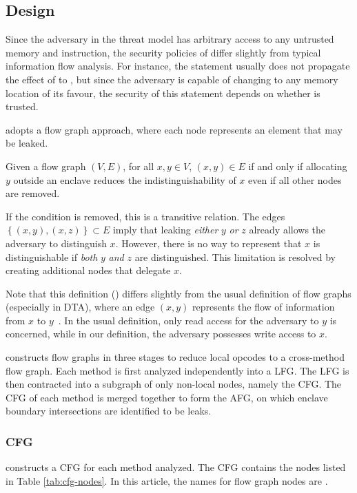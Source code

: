 \subsection{Design}\label{subsec:design}
Since the adversary in the threat model
has arbitrary access to any untrusted memory and instruction,
the security policies of \pname{} differ slightly from typical information flow analysis.
For instance, the statement  usually
does not propagate the effect of  to ,
but since the adversary is capable of changing  to any memory location of its favour,
the security of this statement depends on whether  is trusted.

\pname{} adopts a flow graph approach,
where each node represents an element that may be leaked.

\begin{defin}
	Given a flow graph $(V, E)$, for all $x, y \in V$,
	$(x, y) \in E$ if and only if
	allocating $y$ outside an enclave reduces the indistinguishability of $x$
	even if all other nodes are removed.

	If the  condition is removed, this is a transitive relation.
  The edges $\left\{(x, y), (x, z)\right\} \subset E$ imply that
  leaking \emph{either} $y$ \emph{or} $z$ already allows the adversary to distinguish $x$.
  However, there is no way to represent that $x$ is distinguishable if
  \emph{both} $y$ \emph{and} $z$ are distinguished.
  This limitation is resolved by creating additional nodes that delegate $x$.
\end{defin}

Note that this definition () differs slightly from
the usual definition of flow graphs (especially in \ac{DTA}),
where an edge $(x, y)$ represents the flow of information from $x$ to $y$~\cite{YinHeng2007Pcsi}.
In the usual definition, only read access for the adversary to $y$ is concerned,
while in our definition, the adversary possesses write access to $x$.

\pname{} constructs flow graphs in three stages
to reduce local opcodes to a cross-method flow graph.
Each method is first analyzed independently into a \ac{LFG}.
The \ac{LFG} is then contracted into a subgraph of only non-local nodes,
namely the \ac{CFG}.
The \ac{CFG} of each method is merged together to form the \ac{AFG},
on which enclave boundary intersections are identified to be leaks.

\subsubsection{\acf{CFG}}\label{subsubsec:cfg}
\pname{} constructs a \ac{CFG} for each method analyzed.
The \ac{CFG} contains the nodes listed in Table \ref{tab:cfg-nodes}.
In this article, the names for flow graph nodes are .


